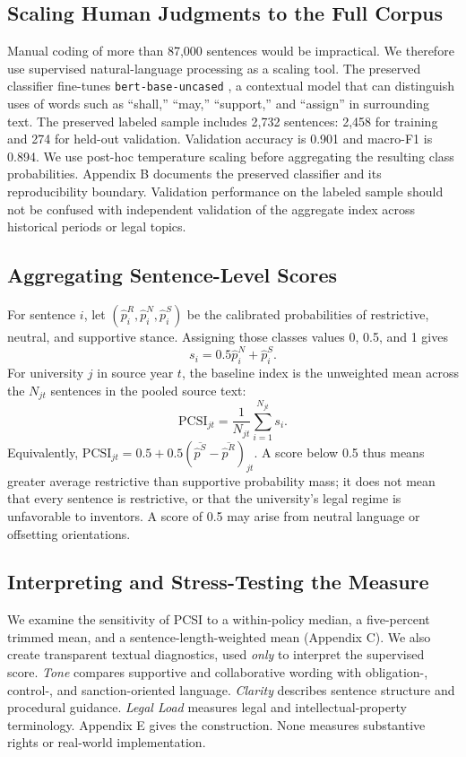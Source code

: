 \documentclass[11pt]{article}
\newcommand{\pcsi}{\mathrm{PCSI}}
\begin{document}
\subsection{Scaling Human Judgments to the Full Corpus}
Manual coding of more than 87,000 sentences would be impractical. We therefore use supervised natural-language processing as a scaling tool. The preserved classifier fine-tunes \texttt{bert-base-uncased} \citep{devlin2019}, a contextual model that can distinguish uses of words such as ``shall,'' ``may,'' ``support,'' and ``assign'' in surrounding text. The preserved labeled sample includes 2,732 sentences: 2,458 for training and 274 for held-out validation. Validation accuracy is 0.901 and macro-F1 is 0.894. We use post-hoc temperature scaling \citep{guo2017} before aggregating the resulting class probabilities. Appendix B documents the preserved classifier and its reproducibility boundary. Validation performance on the labeled sample should not be confused with independent validation of the aggregate index across historical periods or legal topics.

\subsection{Aggregating Sentence-Level Scores}
For sentence $i$, let $(\hat p_i^R,\hat p_i^N,\hat p_i^S)$ be the calibrated probabilities of restrictive, neutral, and supportive stance. Assigning those classes values 0, 0.5, and 1 gives
\begin{equation}\label{eq:sentence}s_i=0.5\hat p_i^N+\hat p_i^S.\end{equation}
For university $j$ in source year $t$, the baseline index is the unweighted mean across the $N_{jt}$ sentences in the pooled source text:
\begin{equation}\label{eq:pcsi}\pcsi_{jt}=\frac{1}{N_{jt}}\sum_{i=1}^{N_{jt}}s_i.\end{equation}
Equivalently, $\pcsi_{jt}=0.5+0.5(\overline{\hat p^S}-\overline{\hat p^R})_{jt}$. A score below 0.5 thus means greater average restrictive than supportive probability mass; it does not mean that every sentence is restrictive, or that the university's legal regime is unfavorable to inventors. A score of 0.5 may arise from neutral language or offsetting orientations.

\subsection{Interpreting and Stress-Testing the Measure}
We examine the sensitivity of PCSI to a within-policy median, a five-percent trimmed mean, and a sentence-length-weighted mean (Appendix C). We also create transparent textual diagnostics, used \emph{only} to interpret the supervised score. \emph{Tone} compares supportive and collaborative wording with obligation-, control-, and sanction-oriented language. \emph{Clarity} describes sentence structure and procedural guidance. \emph{Legal Load} measures legal and intellectual-property terminology. Appendix E gives the construction. None measures substantive rights or real-world implementation.
\end{document}
